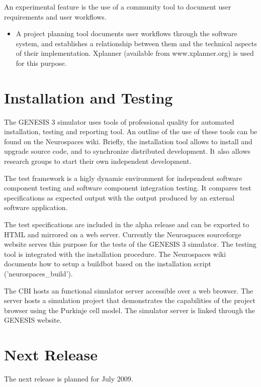 \documentclass[12pt]{article}
\begin{document}
An experimental feature is the use of a community tool to document
user requirements and user workflows.

\begin{itemize}
\item A project planning tool documents user workflows through the
  software system, and establishes a relationship between them and the
  technical aspects of their implementation.  Xplanner (available from
  www.xplanner.org) is used for this purpose.
\end{itemize}


\section{Installation and Testing}

The GENESIS 3 simulator uses tools of professional quality for
automated installation, testing and reporting tool.  An outline of the
use of these tools can be found on the Neurospaces wiki.  Briefly, the
installation tool allows to install and upgrade source code, and to
synchronize distributed development.  It also allows research groups
to start their own independent development.

The test framework is a higly dynamic environment for independent
software component testing and software component integration testing.
It compares test specifications as expected output with the output
produced by an external software application.

The test specifications are included in the alpha release and can be
exported to HTML and mirrored on a web server.  Currently the
Neurospaces sourceforge website serves this purpose for the tests of
the GENESIS 3 simulator.  The testing tool is integrated with the
installation procedure.  The Neurospaces wiki documents how to setup a
buildbot based on the installation script ('neurospaces\_build').

The CBI hosts an functional simulator server accessible over a web
browser.  The server hosts a simulation project that demonstrates the
capabilities of the project browser using the Purkinje cell model.
The simulator server is linked through the GENESIS website.


\section{Next Release}

The next release is planned for July 2009.
\end{document}

